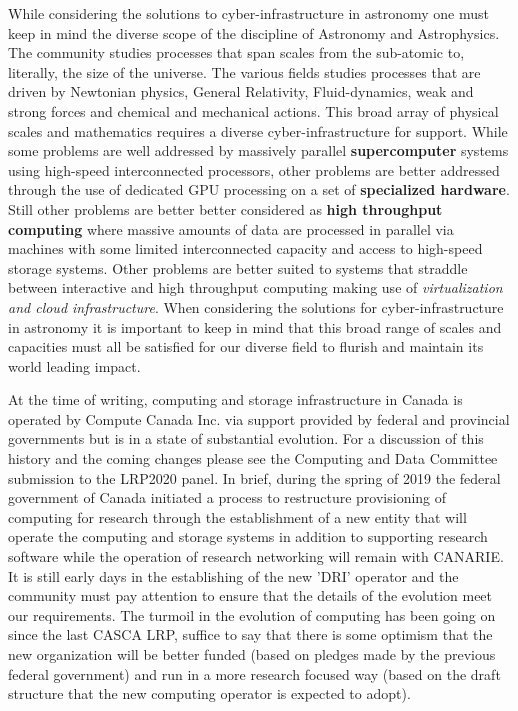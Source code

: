 \documentclass[11pt]{article}
\begin{document}

While considering the solutions to cyber-infrastructure in astronomy one must keep in mind the diverse scope of the discipline of Astronomy and Astrophysics. The community studies processes that span scales from the sub-atomic to, literally, the size of the universe.  
The various fields studies processes that are driven by Newtonian physics, General Relativity, Fluid-dynamics, weak and strong forces and chemical and mechanical actions. 
This broad array of physical scales and mathematics requires a diverse cyber-infrastructure for support.
While some problems are well addressed by massively parallel {\bf supercomputer} systems using high-speed interconnected processors, other problems are better addressed through the use of dedicated GPU processing on a set of {\bf specialized hardware}.  
Still other problems are better better considered as {\bf high throughput computing} where massive amounts of data are processed in parallel via machines with some limited interconnected capacity and access to high-speed storage systems.  
Other problems are better suited to systems that straddle between interactive and high throughput computing making use of {\em virtualization and cloud infrastructure}.
When considering the solutions for cyber-infrastructure in astronomy it is important to keep in mind that this broad range of scales and capacities must all be satisfied for our diverse field to flurish and maintain its world leading impact.

At the time of writing, computing and storage infrastructure in Canada is operated by Compute Canada Inc. via support provided by federal and provincial governments but is in a state of substantial evolution.  For a discussion of this history and the coming changes please see the Computing and Data Committee submission to the LRP2020 panel.  
In brief, during the spring of 2019 the federal government of Canada initiated a process to restructure provisioning of computing for research through the establishment of a new entity that will operate the computing and storage systems in addition to supporting research software while the operation of research networking will remain with CANARIE.  
It is still early days in the establishing of the new 'DRI' operator and the community must pay attention to ensure that the details of the evolution meet our requirements.  The turmoil in the evolution of computing has been going on since the last CASCA LRP, suffice to say that there is some optimism that the new organization will be better funded (based on pledges made by the previous federal government) and run in a more research focused way (based on the draft structure that the new computing operator is expected to adopt). 
\end{document}
